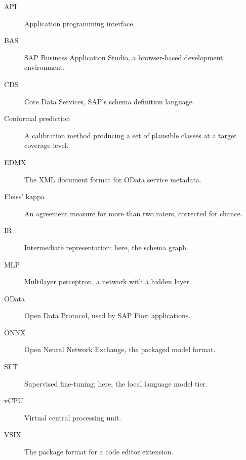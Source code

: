 \documentclass[journal]{IEEEtran}
\begin{document}
\begin{description}
  \item[API] Application programming interface.
  \item[BAS] SAP Business Application Studio, a browser-based
    development environment.
  \item[CDS] Core Data Services, SAP's schema definition language.
  \item[Conformal prediction] A calibration method producing a set of
    plausible classes at a target coverage level.
  \item[EDMX] The XML document format for OData service metadata.
  \item[Fleiss' kappa] An agreement measure for more than two raters,
    corrected for chance.
  \item[IR] Intermediate representation; here, the schema graph.
  \item[MLP] Multilayer perceptron, a network with a hidden layer.
  \item[OData] Open Data Protocol, used by SAP Fiori applications.
  \item[ONNX] Open Neural Network Exchange, the packaged model format.
  \item[SFT] Supervised fine-tuning; here, the local language model
    tier.
  \item[vCPU] Virtual central processing unit.
  \item[VSIX] The package format for a code editor extension.
\end{description}
\end{document}
